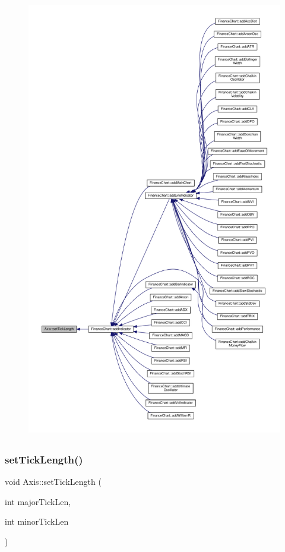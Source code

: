 \begin{figure}[H]
\begin{center}
\leavevmode
\includegraphics[height=550pt]{class_axis_aa74e4bc19a6a83b0f8dc6d3f815dd64e_icgraph}
\end{center}
\end{figure}
\mbox{\label{class_axis_a80b7689e4f8ce5961937b9da00d9a5d7}} 
\subsubsection{\texorpdfstring{set\+Tick\+Length()}{setTickLength()}\hspace{0.1cm}{\footnotesize\ttfamily [2/2]}}
{\footnotesize\ttfamily void Axis\+::set\+Tick\+Length (\begin{DoxyParamCaption}\item[{int}]{major\+Tick\+Len,  }\item[{int}]{minor\+Tick\+Len }\end{DoxyParamCaption})\hspace{0.3cm}{\ttfamily [inline]}}



